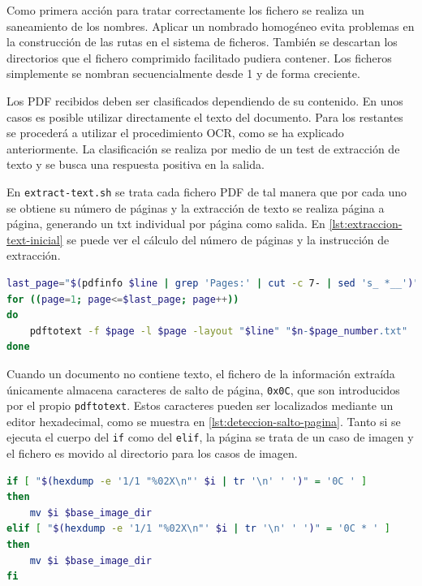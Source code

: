 Como primera acción para tratar correctamente los fichero se realiza un saneamiento de los nombres. Aplicar un nombrado homogéneo evita problemas en la construcción de las rutas en el sistema de ficheros. También se descartan los directorios que el fichero comprimido facilitado pudiera contener. Los ficheros simplemente se nombran secuencialmente desde 1 y de forma creciente.

Los PDF recibidos deben ser clasificados dependiendo de su contenido. En unos casos es posible utilizar directamente el texto del documento. Para los restantes se procederá a utilizar el procedimiento OCR, como se ha explicado anteriormente. La clasificación se realiza por medio de un test de extracción de texto y se busca una respuesta positiva en la salida.

En \verb|extract-text.sh| se trata cada fichero PDF de tal manera que por cada uno se obtiene su número de páginas y la extracción de texto se realiza página a página, generando un txt individual por página como salida. En \ref{lst:extraccion-text-inicial} se puede ver el cálculo del número de páginas y la instrucción de extracción.

\begin{lstlisting}[language=bash,caption={Extracción tentativa del texto},label=lst:extraccion-text-inicial]
last_page="$(pdfinfo $line | grep 'Pages:' | cut -c 7- | sed 's_ *__')"
for ((page=1; page<=$last_page; page++))
do
    pdftotext -f $page -l $page -layout "$line" "$n-$page_number.txt"
done
\end{lstlisting}

Cuando un documento no contiene texto, el fichero de la información extraída únicamente almacena caracteres de salto de página, \verb|0x0C|, que son introducidos por el propio \verb|pdftotext|. Estos caracteres pueden ser localizados mediante un editor hexadecimal, como se muestra en \ref{lst:deteccion-salto-pagina}. Tanto si se ejecuta el cuerpo del \verb|if| como del \verb|elif|, la página se trata de un caso de imagen y el fichero es movido al directorio para los casos de imagen.

\begin{lstlisting}[language=bash,caption={Detección del salto de página},label=lst:deteccion-salto-pagina]
if [ "$(hexdump -e '1/1 "%02X\n"' $i | tr '\n' ' ')" = '0C ' ]
then
    mv $i $base_image_dir
elif [ "$(hexdump -e '1/1 "%02X\n"' $i | tr '\n' ' ')" = '0C * ' ]
then
    mv $i $base_image_dir
fi
\end{lstlisting}

